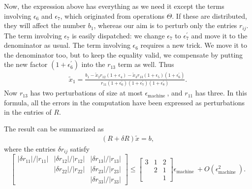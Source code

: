 Now, the expression above has everything as we need it except the terms involving $\epsilon_6$ and $\epsilon_7$, which originated from operations $\Theta$. If these are distributed, they will affect the number $b_1$, whereas our aim is to perturb only the entries $r_{i j}$. The term involving $\epsilon_7$ is easily dispatched: we change $\epsilon_7$ to $\epsilon_7^{\prime}$ and move it to the denominator as usual. The term involving $\epsilon_6$ requires a new trick. We move it to the denominator too, but to keep the equality valid, we compensate by putting the new factor $\left(1+\epsilon_6^{\prime}\right)$ into the $r_{13}$ term as well. Thus
\begin{align*}
\tilde{x}_1=\frac{b_1-\tilde{x}_2 r_{12}\left(1+\epsilon_4\right)-\tilde{x}_3 r_{13}\left(1+\epsilon_5\right)\left(1+\epsilon_6^{\prime}\right)}{r_{11}\left(1+\epsilon_6^{\prime}\right)\left(1+\epsilon_7^{\prime}\right)\left(1+\epsilon_8^{\prime}\right)} .
\end{align*}
Now $r_{13}$ has two perturbations of size at most $\epsilon_{\text {machine }}$, and $r_{11}$ has three. In this formula, all the errors in the computation have been expressed as perturbations in the entries of $R$.

The result can be summarized as
\begin{align*}
(R+\delta R) \tilde{x}=b,
\end{align*}
where the entries $\delta r_{i j}$ satisfy
\[
    \left[\begin{array}{ccc}
        \left|\delta r_{11}\right| /\left|r_{11}\right| & \left|\delta r_{12}\right| /\left|r_{12}\right| & \left|\delta r_{13}\right| /\left|r_{13}\right| \\
        & \left|\delta r_{22}\right| /\left|r_{22}\right| & \left|\delta r_{23}\right| /\left|r_{23}\right| \\
        & & \left|\delta r_{33}\right| /\left|r_{33}\right|
        \end{array}\right] \leq\left[\begin{array}{ccc}
        3 & 1 & 2 \\
        & 2 & 1 \\
        & & 1
        \end{array}\right] \epsilon_{\text {machine }}+O\left(\epsilon_{\text {machine }}^2\right). 
\]

